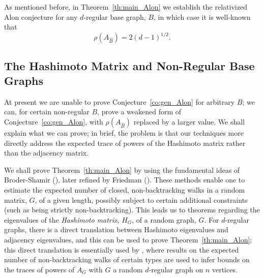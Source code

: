 \documentclass{memo-l}
\theoremstyle{plain}
\theoremstyle{definition}
\numberwithin{section}{chapter}
\numberwithin{equation}{chapter}
\theoremstyle{plain}
\theoremstyle{definition}
\begin{document}
As mentioned before, in Theorem~\ref{th:main_Alon} we establish
the relativized Alon conjecture for any 
$d$-regular base graph, $B$, in which
case it is well-known that 
$$
\rho(A_{\widehat B}) = 2(d-1)^{1/2} .
$$


\subsection{The Hashimoto Matrix and Non-Regular Base Graphs}

At present we are unable to prove Conjecture~\ref{co:gen_Alon}
for arbitrary $B$; we can, for certain non-regular $B$, prove
a weakened form
of Conjecture~\ref{co:gen_Alon}, 
with $\rho(A_{\widehat B})$ replaced by a
larger value.  We shall explain what we can prove; in brief, the problem
is that our
techniques more directly address the expected trace of powers of 
the Hashimoto matrix rather than the adjacency matrix.

We shall prove Theorem~\ref{th:main_Alon} by using 
the fundamental ideas of Broder-Shamir (\cite{broder}), later refined by
Friedman (\cite{friedman_random_graphs,friedman_alon}).
These methods enable one to estimate the expected number of closed,
non-backtracking
walks in a random matrix, $G$, of a given length,
possibly subject to certain additional constraints (such as being
strictly non-backtracking).
This leads us to theorems regarding the eigenvalues of
the {\em Hashimoto
matrix}, 
$H_G$, of a random graph, $G$.  
For $d$-regular graphs,
there is a direct translation between Hashimoto eigenvalues and 
adjacency eigenvalues, and this can be used
to prove Theorem~\ref{th:main_Alon};
this direct translation is essentially used by
\cite{broder,friedman_random_graphs,friedman_alon}, where results
on the expected number of non-backtracking walks of certain types
are used to infer bounds on the traces of powers of $A_G$ with 
$G$ a random $d$-regular graph on $n$ vertices.
\end{document}
